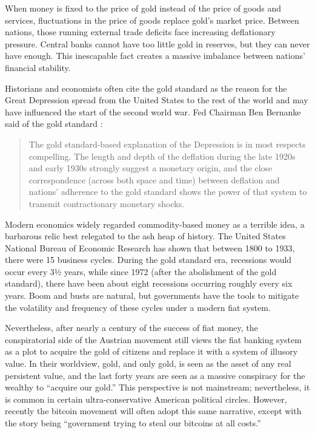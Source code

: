 When money is fixed to the price of gold instead of the price of goods and
services, fluctuations in the price of goods replace gold's market price.
Between nations, those running external trade deficits face increasing
deflationary pressure. Central banks cannot have too little gold in reserves,
but they can never have enough. This inescapable fact creates a massive
imbalance between nations' financial stability. \cite{roche_understanding_2011}


Historians and economists often cite the gold standard as the reason for the
Great Depression spread from the United States to the rest of the world and may
have influenced the start of the second world war. Fed Chairman Ben Bernanke
said of the gold standard \cite{bernanke_essays_2004}:

\begin{quote}
The gold standard-based explanation of the Depression is in most
respects compelling. The length and depth of the deflation during the
late 1920s and early 1930s strongly suggest a monetary origin, and the
close correspondence (across both space and time) between deflation and
nations' adherence to the gold standard shows the power of that system
to transmit contractionary monetary shocks.
\end{quote}

Modern economics widely regarded commodity-based money as a terrible idea, a
barbarous relic best relegated to the ash heap of history. The United States
National Bureau of Economic Research has shown that between 1800 to 1933, there
were 15 business cycles. During the gold standard era, recessions would occur
every 3½ years, while since 1972 (after the abolishment of the gold standard),
there have been about eight recessions occurring roughly every six years. Boom
and busts are natural, but governments have the tools to mitigate the volatility
and frequency of these cycles under a modern fiat system.

Nevertheless, after nearly a century of the success of fiat money, the
conspiratorial side of the Austrian movement still views the fiat banking system
as a plot to acquire the gold of citizens and replace it with a system of
illusory value. In their worldview, gold, and only gold, is seen as the asset of
any real persistent value, and the last forty years are seen as a massive
conspiracy for the wealthy to ``acquire our gold.'' This perspective is not
mainstream; nevertheless, it is common in certain ultra-conservative American
political circles. However, recently the bitcoin movement will often adopt this
same narrative, except with the story being ``government trying to steal our
bitcoins at all costs.''

